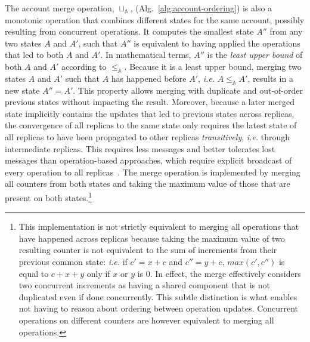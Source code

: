 \documentclass[9pt]{article}   	%
\begin{document}
The account merge operation, $\sqcup_\mathds{A}$, (Alg.~\ref{alg:account-ordering}) is also a monotonic operation that combines different states for the same account, possibly resulting from concurrent operations. It computes the smallest state $A''$ from any two states $A$ and $A'$, such that $A''$ is equivalent to having applied the operations that led to both $A$ and $A'$. In mathematical terms, $A''$ is the \textit{least upper bound} of both $A$ and $A'$ according to $\leq_\mathds{A}$. Because it is a least upper bound, merging two states $A$ and $A'$ such that $A$ has happened before $A'$, \textit{i.e.} $A \leq_\mathds{A} A'$, results in a new state $A'' = A'$. This property allows merging with duplicate and out-of-order previous states without impacting the result. Moreover, because a later merged state implicitly contains the updates that led to previous states across replicas, the convergence of all replicas to the same state only requires the latest state of all replicas to have been propagated to other replicas \textit{transitively}, \textit{i.e.} through intermediate replicas. This requires less messages and better tolerates lost messages than operation-based approaches, which require explicit broadcast of every operation to all replicas~\cite{shapiro:hal-00932836}. The merge operation is implemented by merging all counters from both states and taking the maximum value of those that are present on both states.\footnote{This implementation is not strictly equivalent to merging all operations that have happened across replicas because taking the maximum value of two resulting counter is not equivalent to the sum of increments from their previous common state: \textit{i.e.} if $c' = x + c$ and $c'' = y + c$, $max(c', c'')$ is equal to $c + x + y$ only if $x$ or $y$ is $0$. In effect, the merge effectively considers two concurrent increments as having a shared component that is not duplicated even if done concurrently. This subtle distinction is what enables not having to reason about ordering between operation updates. Concurrent operations on different counters are however equivalent to merging all operations.}
\end{document}
